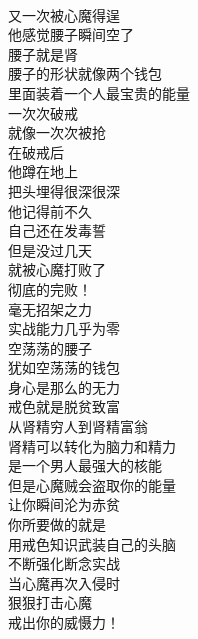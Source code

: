 \begin{poem}[空荡荡的腰子]
    \begin{multicols}{2}
        \begin{center}~\\
            又一次被心魔得逞 \\ 他感觉腰子瞬间空了 \\ 腰子就是肾 \\ 腰子的形状就像两个钱包 \\ 里面装着一个人最宝贵的能量 \\ 一次次破戒 \\ 就像一次次被抢 \\ 在破戒后 \\ 他蹲在地上 \\ 把头埋得很深很深 \\ 他记得前不久 \\ 自己还在发毒誓 \\ 但是没过几天 \\ 就被心魔打败了 \\ 彻底的完败！ \\ 毫无招架之力 \\ 实战能力几乎为零 \\ 空荡荡的腰子 \\ 犹如空荡荡的钱包 \\ 身心是那么的无力 \\ 戒色就是脱贫致富 \\ 从肾精穷人到肾精富翁 \\ 肾精可以转化为脑力和精力 \\ 是一个男人最强大的核能 \\ 但是心魔贼会盗取你的能量 \\ 让你瞬间沦为赤贫 \\ 你所要做的就是 \\ 用戒色知识武装自己的头脑 \\ 不断强化断念实战 \\ 当心魔再次入侵时 \\ 狠狠打击心魔 \\ 戒出你的威慑力！
        \end{center}
    \end{multicols}
\end{poem}


